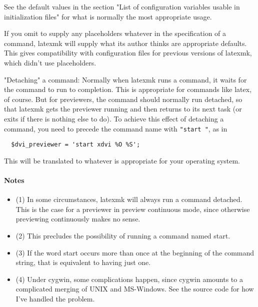 See  the default values in the section "List of configuration variables usable
in initialization files" for what is normally the most appropriate usage.

If you omit to supply any placeholders whatever in the specification of a
command, latexmk will supply what its author thinks  are  appropriate defaults.
This gives compatibility with configuration files for previous versions of
latexmk, which didn't use placeholders.

"Detaching" a command: Normally when latexmk runs a command,  it  waits
for the command to run to completion.  This is appropriate for commands
like latex, of course.  But for previewers, the command should normally run
detached,  so that latexmk gets the previewer running and then returns to its
next task (or exits if there is nothing else to  do).   To achieve  this
effect  of  detaching a command, you need to precede the command name with
\verb|"start "|, as in

\begin{verbatim}
  $dvi_previewer = 'start xdvi %O %S';
\end{verbatim}

This will be translated to whatever is appropriate for  your  operating
system.

\paragraph{Notes}

\begin{itemize}
  \item (1) In some circumstances, latexmk will always run a command detached.  This
is the case for a previewer in preview  continuous  mode, since  otherwise
previewing continuously makes no sense.  

  \item (2) This precludes the possibility of running a command named start.   

  \item (3)  If  the word  start  occurs  more  than  once  at  the beginning
          of the command string, that is equivalent to having just one.  

  \item (4) Under cygwin,  some complications  happen, since cygwin amounts to a
        complicated merging of UNIX and MS-Windows.  See the source code  for
        how  I've  handled  the problem.
\end{itemize}

